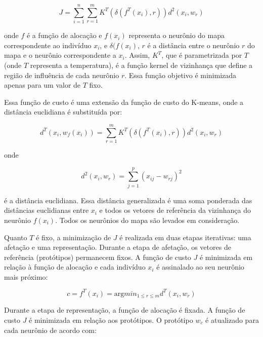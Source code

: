 \documentclass[a4paper,oneside,12pt]{article}
\begin{document}
\begin{enumerate}[1.]
\begin{equation}
J = \sum_{i=1}^{n} \sum_{r=1}^{m} K^{T} (\delta(f^{T}(x_{i}),r))d^{2}(x_{i},w_{r})
\end{equation}

onde $f$ \'e a fun\c{c}\~ao de aloca\c{c}\~ao e $f(x_{i})$ representa o neur\^onio do mapa correspondente ao indiv\'iduo $x_{i}$, e $\delta(f(x_{i})$, $r$ \'e a dist\^ancia entre o neur\^onio $r$ do mapa e o neur\^onio correspondente a $x_{i}$. Assim, $K^T$, que \'e parametrizada por $T$ (onde $T$ representa a temperatura), \'e a fun\c{c}\~ao kernel de vizinhança que define a regi\~ao de influ\^encia de cada neur\^onio $r$. Essa fun\c{c}\~ao objetivo \'e minimizada apenas para um valor de $T$ fixo.

Essa fun\c{c}\~ao de custo \'e uma extens\~ao da fun\c{c}\~ao de custo do K-means, onde a dist\^ancia euclidiana \'e substitu\'ida por:

\begin{equation}
d^{T}(x_{i}, w_{f}(x_{i})) = \sum_{r=1}^{m} K^{T} (\delta(f^{T}(x_{i}),r))d^{2}(x_{i},w_{r})
\end{equation}

onde

\begin{equation}
d^{2}(x_{i},w_{r}) = \sum_{j=1}^{p} (x_{ij} - w_{rj})^2
\end{equation}

\'e a dist\^ancia euclidiana. Essa dist\^ancia generalizada \'e uma soma ponderada das dist\^ancias euclidianas entre $x_{i}$ e todos os vetores de refer\^encia da vizinhan\c{c}a do neur\^onio $f(x_{i})$. Todos os neur\^onios do mapa s\~ao levados em considera\c{c}\~ao.

Quanto $T$ \'e fixo, a minimiza\c{c}\~ao de $J$ \'e realizada em duas etapas iterativas: uma afeta\c{c}\~ao e uma representa\c{c}\~ao.
Durante a etapa de afeta\c{c}\~ao, os vetores de refer\^encia (prot\'otipos) permanecem fixos. A fun\c{c}\~ao de custo $J$ \'e minimizada em rela\c{c}\~ao \`a fun\c{c}\~ao de aloca\c{c}\~ao e cada indiv\'iduo $x_{i}$ \'e assinalado ao seu neur\^onio mais pr\'oximo:

\begin{equation} \label{eq:c}
c = f^{T}(x_{i}) = \text{arg} min_{1\leq r \leq m} d^{T}(x_{i}, w_{r})
\end{equation}

Durante a etapa de representa\c{c}\~ao, a fun\c{c}\~ao de aloca\c{c}\~ao \'e fixada. A fun\c{c}\~ao de custo $J$ \'e minimizada em rela\c{c}\~ao aos prot\'otipos. O prot\'otipo $w_{c}$ \'e atualizado para cada neur\^onio de acordo com:


\end{enumerate}
\end{document}

